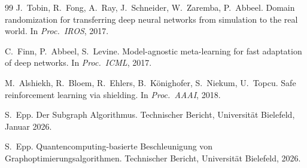 ﻿\documentclass[a4paper,12pt]{article}
\theoremstyle{definition}
\begin{document}
\begin{thebibliography}{99}
J.\ Tobin, R.\ Fong, A.\ Ray, J.\ Schneider, W.\ Zaremba, P.\ Abbeel.
\newblock Domain randomization for transferring deep neural networks from
  simulation to the real world.
\newblock In \emph{Proc.\ IROS}, 2017.

C.\ Finn, P.\ Abbeel, S.\ Levine.
\newblock Model-agnostic meta-learning for fast adaptation of deep networks.
\newblock In \emph{Proc.\ ICML}, 2017.

M.\ Alshiekh, R.\ Bloem, R.\ Ehlers, B.\ K\"onighofer, S.\ Niekum, U.\ Topcu.
\newblock Safe reinforcement learning via shielding.
\newblock In \emph{Proc.\ AAAI}, 2018.

S.\ Epp.
\newblock Der Subgraph Algorithmus.
\newblock Technischer Bericht, Universit\"at Bielefeld, Januar 2026.

S.\ Epp.
\newblock Quantencomputing-basierte Beschleunigung von Graphoptimierungsalgorithmen.
\newblock Technischer Bericht, Universit\"at Bielefeld, 2026.

\end{thebibliography}
\end{document}
